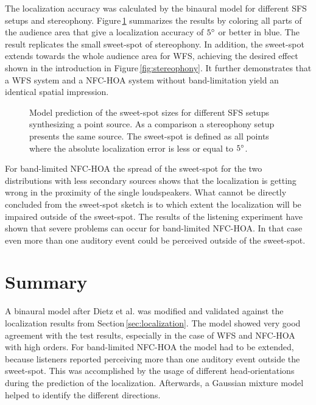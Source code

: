The localization accuracy was calculated by the binaural model for different
\ac{SFS} setups and stereophony. Figure\,\ref{fig:sweet-spot-size} summarizes
the results by coloring all parts of the audience area that give a
localization accuracy of $5^\circ$ or better in blue.
The result replicates the small sweet-spot of stereophony. In addition,
the sweet-spot extends towards the whole audience area for \ac{WFS}, achieving the
desired effect shown in the introduction in Figure\,\ref{fig:stereophony}.
It further demonstrates that a \ac{WFS} system and a
\ac{NFC-HOA} system without band-limitation yield an identical spatial
impression.
%
\begin{figure}
    \small
    \centering
    
    \caption{Model prediction of the sweet-spot sizes for different \ac{SFS}
    setups synthesizing a point source. As a comparison a stereophony setup
    presents the same source.
    The sweet-spot is defined as all points where the absolute localization error
    is less or equal to $5^\circ$.
    }
    \label{fig:sweet-spot-size}
\end{figure}

\newpage

For band-limited \ac{NFC-HOA} the spread of the sweet-spot for the two
distributions with less secondary sources shows that the localization is getting
wrong in the proximity of the single loudspeakers.
What cannot be directly concluded from the sweet-spot sketch is to which extent
the localization will be impaired outside of the sweet-spot.
The results of the listening experiment have shown that severe problems can occur
for band-limited \ac{NFC-HOA}.
In that case even more than one auditory event could be perceived outside of the sweet-spot.


\section{Summary}
\label{sec:modelling_summary}
%
A binaural model after Dietz et al.\autocite{Dietz2011} was modified and
validated against the localization results from Section\,\ref{sec:localization}.
The model showed very good agreement with the test results, especially in the
case of \ac{WFS} and \ac{NFC-HOA} with high orders. For band-limited \ac{NFC-HOA}
the model had to be extended, because listeners reported perceiving more than
one auditory event outside the sweet-spot. This was accomplished by the
usage of different head-orientations during the prediction of the localization.
Afterwards, a Gaussian mixture model helped to identify the different directions.

